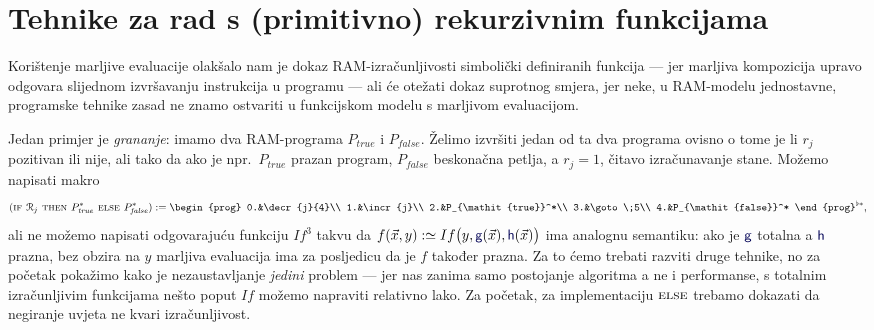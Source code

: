 \section{Tehnike za rad s (primitivno) rekurzivnim funkcijama}\label{sec:tech}

Korištenje marljive evaluacije olakšalo nam je dokaz RAM-izračunljivosti simbolički definiranih funkcija --- jer marljiva kompozicija upravo odgovara slijednom izvršavanju instrukcija u programu --- ali će otežati dokaz suprotnog smjera, jer neke, u RAM-modelu jednostavne, programske tehnike zasad ne znamo ostvariti u funkcijskom modelu s marljivom evaluacijom.

Jedan primjer je \emph{grananje}: imamo dva RAM-programa $P_{\mathit{true}}$ i $P_{\mathit{false}}$. Želimo izvršiti jedan od ta dva programa ovisno o tome je li $r_j$ pozitivan ili nije, ali tako da ako je npr.\ $P_{\mathit{true}}$ prazan program, $P_{\mathit{false}}$ beskonačna petlja, a $r_j=1$, čitavo izračunavanje stane. Možemo napisati makro
\vspace{-2mm}
\begin{equation}
    (\textsc{if $\reg{j}$ then $P_{\mathit{true}}^*$ else $P_{\mathit{false}}^*$}):=\begin{prog}
    0.&\decr{j}{4}\\
    1.&\incr{j}\\
    2.&P_{\mathit{true}}^*\\
    3.&\goto\;5\\
    4.&P_{\mathit{false}}^*
    \end{prog}^{\flat*}\text,
\end{equation}
ali ne možemo napisati odgovarajuću funkciju $If^3$ takvu da $f(\vec x,y):\simeq If\bigl(y,\f g(\vec x),\f h(\vec x)\bigr)$ ima analognu semantiku: ako je $\f g$ totalna a $\f h$ prazna, bez obzira na $y$ marljiva evaluacija ima za posljedicu da je $f$ također prazna. Za to ćemo trebati razviti druge tehnike, no za početak pokažimo kako je nezaustavljanje \emph{jedini} problem --- jer nas zanima samo postojanje algoritma a ne i performanse, s totalnim izračunljivim funkcijama nešto poput $If$ možemo napraviti relativno lako. 
 Za početak, za implementaciju $\textsc{else}$ trebamo dokazati da negiranje uvjeta ne kvari izračunljivost.%

